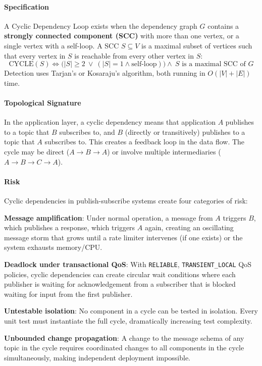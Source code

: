 \documentclass[11pt]{article}
\begin{document}
\paragraph{Specification}
A Cyclic Dependency Loop exists when the dependency graph $G$ contains a \textbf{strongly connected component (SCC)} with more than one vertex, or a single vertex with a self-loop. A SCC $S \subseteq V$ is a maximal subset of vertices such that every vertex in $S$ is reachable from every other vertex in $S$:
\[
\mathrm{CYCLE}(S) \Leftrightarrow \big(|S| \ge 2\ \lor\ (|S| = 1 \land \text{self-loop})\big) \land\ S \text{ is a maximal SCC of } G
\]
Detection uses Tarjan's or Kosaraju's algorithm, both running in $O(|V| + |E|)$ time.

\paragraph{Topological Signature}
In the application layer, a cyclic dependency means that application $A$ publishes to a topic that $B$ subscribes to, and $B$ (directly or transitively) publishes to a topic that $A$ subscribes to. This creates a feedback loop in the data flow. The cycle may be direct ($A \to B \to A$) or involve multiple intermediaries ($A \to B \to C \to A$).

\paragraph{Risk}
Cyclic dependencies in publish-subscribe systems create four categories of risk:

\textbf{Message amplification}: Under normal operation, a message from $A$ triggers $B$, which publishes a response, which triggers $A$ again, creating an oscillating message storm that grows until a rate limiter intervenes (if one exists) or the system exhausts memory/CPU.

\textbf{Deadlock under transactional QoS}: With \texttt{RELIABLE}, \texttt{TRANSIENT\_LOCAL} QoS policies, cyclic dependencies can create circular wait conditions where each publisher is waiting for acknowledgement from a subscriber that is blocked waiting for input from the first publisher.

\textbf{Untestable isolation}: No component in a cycle can be tested in isolation. Every unit test must instantiate the full cycle, dramatically increasing test complexity.

\textbf{Unbounded change propagation}: A change to the message schema of any topic in the cycle requires coordinated changes to all components in the cycle simultaneously, making independent deployment impossible.
\end{document}
